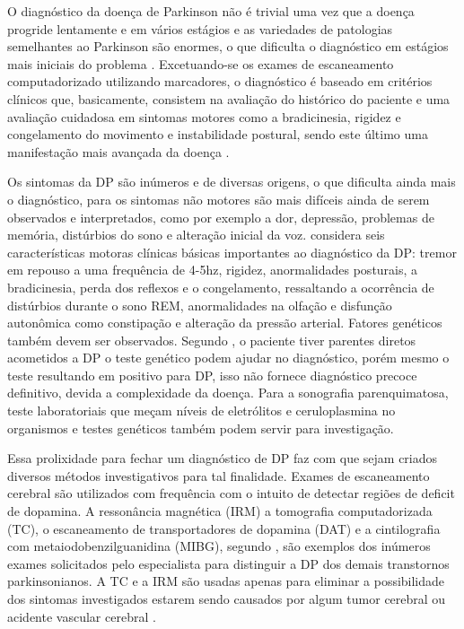 \documentclass[
	12pt,				%
	openany,			%
	oneside,			%
	a4paper,			%
	english,			%
	french,				%
	spanish,			%
	brazil				%
	]{abntex2}
\begin{document}
O diagnóstico da doença de Parkinson não é trivial uma vez que a doença progride lentamente e em vários estágios e as variedades de patologias semelhantes ao Parkinson são enormes, o que dificulta o diagnóstico em estágios mais iniciais do problema \cite{ebook2016}. Excetuando-se os exames de escaneamento computadorizado utilizando marcadores, o diagnóstico é baseado em critérios clínicos que, basicamente, consistem na avaliação do histórico do paciente e uma avaliação cuidadosa em sintomas motores como a bradicinesia, rigidez e congelamento do movimento e instabilidade postural, sendo este último uma manifestação mais avançada da doença \cite{kalia2015}.

Os sintomas da DP são inúmeros e de diversas origens, o que dificulta ainda mais o diagnóstico, para  os sintomas não motores são mais difíceis ainda de serem observados e interpretados, como por exemplo a dor, depressão, problemas de memória, distúrbios do sono e alteração inicial da voz.  considera seis características motoras clínicas básicas importantes ao diagnóstico da DP: tremor em repouso a uma frequência de 4-5hz, rigidez, anormalidades posturais, a bradicinesia, perda dos reflexos e o congelamento, ressaltando a ocorrência de distúrbios durante o sono REM, anormalidades na olfação e disfunção autonômica como constipação e alteração da pressão arterial. Fatores genéticos também devem ser observados. Segundo , o paciente tiver parentes diretos acometidos a DP o teste genético podem ajudar no diagnóstico, porém mesmo o teste resultando em positivo para DP, isso não fornece diagnóstico precoce definitivo, devida a complexidade da doença. Para  a sonografia parenquimatosa, teste laboratoriais que meçam níveis de eletrólitos e ceruloplasmina no organismos e testes genéticos também podem servir para investigação.

Essa prolixidade para fechar um diagnóstico de DP faz com que sejam criados diversos métodos investigativos \cite{levine2003} para tal finalidade. Exames de escaneamento cerebral são utilizados com frequência com o intuito de detectar regiões de deficit de dopamina. A ressonância magnética (IRM) a tomografia computadorizada (TC), o escaneamento de transportadores de dopamina (DAT) e a cintilografia com metaiodobenzilguanidina (MIBG), segundo , são exemplos dos inúmeros exames solicitados pelo especialista para distinguir a DP dos demais transtornos parkinsonianos. A TC e a IRM são usadas apenas para eliminar a possibilidade dos sintomas investigados estarem sendo causados por algum tumor cerebral ou acidente vascular cerebral \cite{nolden2014}.
\end{document}
